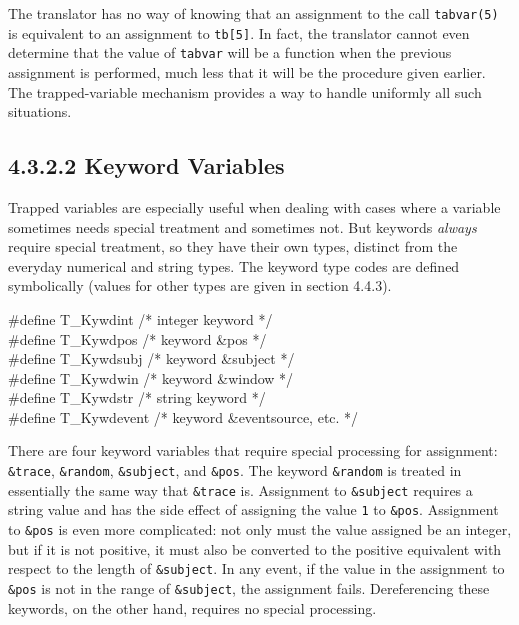 The translator has no way of knowing that an assignment to the call
\texttt{tabvar(5)} is equivalent to an assignment to \texttt{tb[5]}. In
fact, the translator cannot even determine that the value of
\texttt{tabvar} will be a function when the previous assignment is
performed, much less that it will be the procedure given earlier.
The trapped-variable mechanism provides a way to handle
uniformly all such situations.

\subsection[4.3.2.2 Keyword Variables]{4.3.2.2 Keyword Variables}
Trapped variables are especially useful when dealing with cases where a
variable sometimes needs special treatment and sometimes not. But keywords
{\em always} require special treatment, so they have their own types,
distinct from the everyday numerical and string types. The keyword type
codes are defined symbolically (values for other types are given in
section 4.4.3).

\begin{iconcode}
\#define \>\>\>T\_Kywdint	\>\>\>\>\>\> \>\>\>\>/* integer keyword */\\
\#define \>\>\>T\_Kywdpos	\>\>\>\>\>\> \>\>\>\>/* keyword \&pos */\\
\#define \>\>\>T\_Kywdsubj  \>\>\>\>\>\> \>\>\>\>/* keyword \&subject */\\
\#define \>\>\>T\_Kywdwin	\>\>\>\>\>\> \>\>\>\>/* keyword \&window */\\
\#define \>\>\>T\_Kywdstr	\>\>\>\>\>\> \>\>\>\>/* string keyword */\\
\#define \>\>\>T\_Kywdevent \>\>\>\>\>\> \>\>\>\>/* keyword \&eventsource, etc. */
\end{iconcode}

There are four keyword variables that require special processing for
assignment: \texttt{\&trace}, \texttt{\&random}, \texttt{\&subject},
and \texttt{\&pos}. The keyword \texttt{\&random} is treated in
essentially the same way that \texttt{\&trace} is. Assignment to
\texttt{\&subject} requires a string value and has the side effect of
assigning the value \texttt{1} to \texttt{\&pos}. Assignment to
\texttt{\&pos} is even more complicated: not only must the value
assigned be an integer, but if it is not positive, it must also be
converted to the positive equivalent with respect to the length of
\texttt{\&subject}. In any event, if the value in the assignment to
\texttt{\&pos} is not in the range of \texttt{\&subject}, the
assignment fails. Dereferencing these keywords, on the other hand,
requires no special processing.

